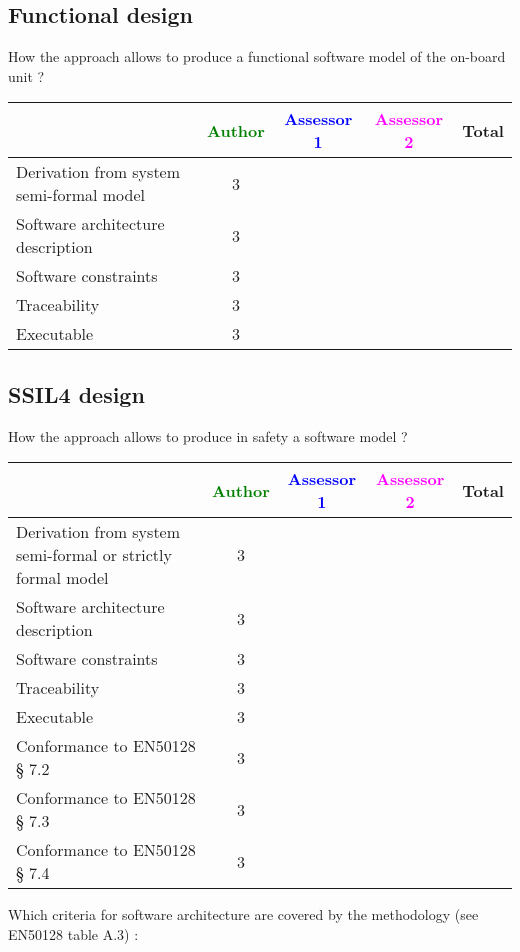 \subsection{Functional design}

How the approach allows to  produce a functional software model of the on-board unit ?

\begin{tabular}{|l | c | c | c | c|}
\hline
& \textcolor{green}{Author} & \textcolor{blue}{Assessor 1} & \textcolor{magenta}{Assessor 2} & Total \\
\hline
Derivation from system semi-formal model  & 3 & & &  \\
\hline 
Software architecture description  & 3 & & &  \\
\hline
Software constraints  & 3 & & &  \\
\hline
Traceability  & 3 & & &  \\
\hline
Executable  & 3  & & &  \\
\hline
\end{tabular}

\subsection{SSIL4 design}

How the approach allows to  produce in safety a software model ?

\begin{tabular}{|l | c | c | c | c|}
\hline
& \textcolor{green}{Author} & \textcolor{blue}{Assessor 1} & \textcolor{magenta}{Assessor 2} & Total \\
\hline
Derivation from system semi-formal or strictly formal model  & 3 & & &  \\
\hline 
Software architecture description  & 3 & & &  \\
\hline
Software constraints  & 3 & & &  \\
\hline
Traceability  & 3 & & &  \\
\hline
Executable  & 3 & & &  \\
\hline
Conformance to EN50128 § 7.2  & 3 & & &  \\
\hline
Conformance to EN50128 § 7.3  & 3 & & &  \\
\hline
Conformance to EN50128 § 7.4  & 3 & & &  \\
\hline
\end{tabular}

Which criteria for software architecture are covered by the methodology
(see EN50128 table A.3) :

